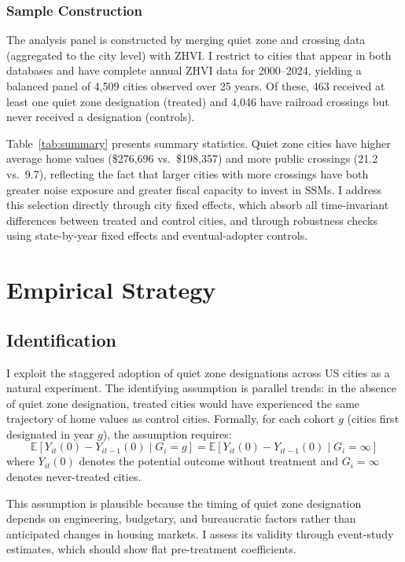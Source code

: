 \documentclass[12pt]{article}
\newcommand{\E}{\mathbb{E}}
\begin{document}
\subsubsection*{Sample Construction} The analysis panel is constructed by merging quiet zone and crossing data (aggregated to the city level) with ZHVI. I restrict to cities that appear in both databases and have complete annual ZHVI data for 2000--2024, yielding a balanced panel of 4,509 cities observed over 25 years. Of these, 463 received at least one quiet zone designation (treated) and 4,046 have railroad crossings but never received a designation (controls).



Table~\ref{tab:summary} presents summary statistics. Quiet zone cities have higher average home values (\$276,696 vs.\ \$198,357) and more public crossings (21.2 vs.\ 9.7), reflecting the fact that larger cities with more crossings have both greater noise exposure and greater fiscal capacity to invest in SSMs. I address this selection directly through city fixed effects, which absorb all time-invariant differences between treated and control cities, and through robustness checks using state-by-year fixed effects and eventual-adopter controls.


\section{Empirical Strategy}

\subsection{Identification}

I exploit the staggered adoption of quiet zone designations across US cities as a natural experiment. The identifying assumption is parallel trends: in the absence of quiet zone designation, treated cities would have experienced the same trajectory of home values as control cities. Formally, for each cohort $g$ (cities first designated in year $g$), the assumption requires:
\begin{equation}
\E[Y_{it}(0) - Y_{it-1}(0) \mid G_i = g] = \E[Y_{it}(0) - Y_{it-1}(0) \mid G_i = \infty]
\end{equation}
where $Y_{it}(0)$ denotes the potential outcome without treatment and $G_i = \infty$ denotes never-treated cities.

This assumption is plausible because the timing of quiet zone designation depends on engineering, budgetary, and bureaucratic factors rather than anticipated changes in housing markets. I assess its validity through event-study estimates, which should show flat pre-treatment coefficients.
\end{document}
